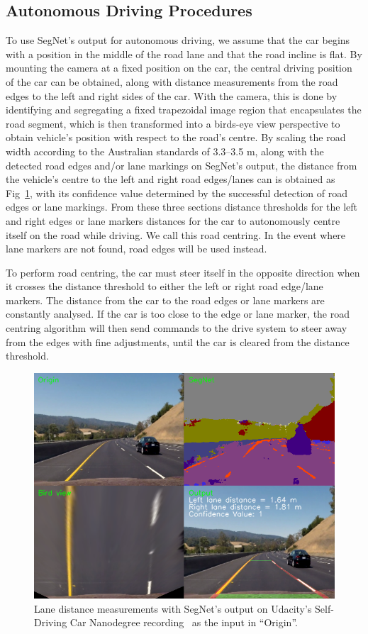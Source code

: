 \subsection{Autonomous Driving Procedures}
To use SegNet's output for autonomous driving, we assume that the car begins with a position in the middle of the road lane and that the road incline is flat. By mounting the camera at a fixed position on the car, the central driving position of the car can be obtained, along with distance measurements from the road edges to the left and right sides of the car. With the camera, this is done by identifying and segregating a fixed trapezoidal image region that encapsulates the road segment, which is then transformed into a birds-eye view perspective to obtain vehicle's position with respect to the road's centre. By scaling the road width according to the Australian standards of 3.3--3.5 m, along with the detected road edges and/or lane markings on SegNet's output, the distance from the vehicle's centre to the left and right road edges/lanes can is obtained as Fig~\ref{fig:5:4pane}, with its confidence value determined by the successful detection of road edges or lane markings. From these three sections distance thresholds for the left and right edges or lane markers distances for the car to autonomously centre itself on the road while driving. We call this road centring. In the event where lane markers are not found, road edges will be used instead.

To perform road centring, the car must steer itself in the opposite direction when it crosses the distance threshold to either the left or right road edge/lane markers. The distance from the car to the road edges or lane markers are constantly analysed. If the car is too close to the edge or lane marker, the road centring algorithm will then send commands to the drive system to steer away from the edges with fine adjustments, until the car is cleared from the distance threshold.

\begin{figure}[H]
	\centering
	\includegraphics[width=0.8\linewidth]{4pane}
	\caption[Lane distance measurements with SegNet]{Lane distance measurements with SegNet's output on Udacity's Self-Driving Car Nanodegree recording~\cite{udacity_self-driving_2017} as the input in ``Origin''.}
	\label{fig:5:4pane}
\end{figure}

